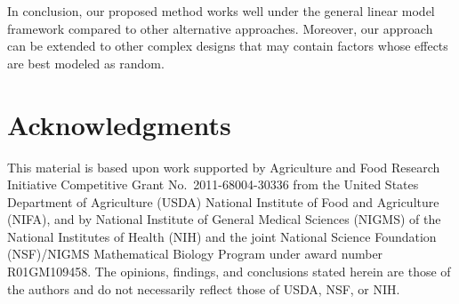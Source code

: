 In conclusion, our proposed method works well under the general linear model framework compared to other alternative approaches. Moreover, our approach can be extended to other complex designs that may contain factors whose effects are best modeled as random.  

\section*{ Acknowledgments}
This material is based upon work supported by Agriculture and Food Research Initiative Competitive Grant No.\ 2011-68004-30336 from the United States Department of Agriculture (USDA) National Institute of Food and Agriculture (NIFA), and by National Institute of General Medical Sciences (NIGMS) of the National Institutes of Health (NIH) and the joint National Science Foundation (NSF)/NIGMS Mathematical Biology Program under award number R01GM109458. The opinions, findings, and conclusions stated herein are those of the authors and do not necessarily reflect those of USDA, NSF, or NIH.


